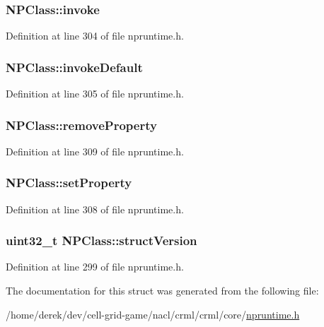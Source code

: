 \hypertarget{struct_n_p_class_a900be8995f5aa9aa871e311f49fb9fb9}{
\subsubsection[{invoke}]{ {\bf NPClass::invoke}}}
\label{struct_n_p_class_a900be8995f5aa9aa871e311f49fb9fb9}


Definition at line 304 of file npruntime.h.

\hypertarget{struct_n_p_class_a8389ce604422deff95ad46f2332f288e}{
\subsubsection[{invokeDefault}]{ {\bf NPClass::invokeDefault}}}
\label{struct_n_p_class_a8389ce604422deff95ad46f2332f288e}


Definition at line 305 of file npruntime.h.

\hypertarget{struct_n_p_class_abfd93f88c9a41e31be0f8419531ecf71}{
\subsubsection[{removeProperty}]{ {\bf NPClass::removeProperty}}}
\label{struct_n_p_class_abfd93f88c9a41e31be0f8419531ecf71}


Definition at line 309 of file npruntime.h.

\hypertarget{struct_n_p_class_ace75075a0c879d88182c73636d725533}{
\subsubsection[{setProperty}]{ {\bf NPClass::setProperty}}}
\label{struct_n_p_class_ace75075a0c879d88182c73636d725533}


Definition at line 308 of file npruntime.h.

\hypertarget{struct_n_p_class_a449b18ae2a318605881bd3a95506f4a3}{
\subsubsection[{structVersion}]{\setlength{\rightskip}{0pt plus 5cm}uint32\_\-t {\bf NPClass::structVersion}}}
\label{struct_n_p_class_a449b18ae2a318605881bd3a95506f4a3}


Definition at line 299 of file npruntime.h.



The documentation for this struct was generated from the following file:\begin{DoxyCompactItemize}
\item 
/home/derek/dev/cell-\/grid-\/game/nacl/crml/crml/core/\hyperlink{npruntime_8h}{npruntime.h}\end{DoxyCompactItemize}
